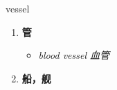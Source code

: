 
\begin{frame}
{\huge vessel}
\begin{center}
\begin{enumerate}\Large
  \item \textbf{管}
  \begin{itemize}
    \item \em{\Large{blood vessel 血管}}
  \end{itemize}
  \item \textbf{船，舰}
\end{enumerate}
\end{center}
\end{frame}
